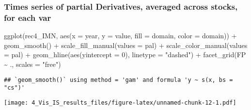\documentclass[
]{article}
\newenvironment{Shaded}{\begin{snugshade}}{\end{snugshade}}
\newcommand{\AttributeTok}[1]{\textcolor[rgb]{0.77,0.63,0.00}{#1}}
\newcommand{\DecValTok}[1]{\textcolor[rgb]{0.00,0.00,0.81}{#1}}
\newcommand{\FunctionTok}[1]{\textcolor[rgb]{0.00,0.00,0.00}{#1}}
\newcommand{\NormalTok}[1]{#1}
\newcommand{\SpecialCharTok}[1]{\textcolor[rgb]{0.00,0.00,0.00}{#1}}
\newcommand{\StringTok}[1]{\textcolor[rgb]{0.31,0.60,0.02}{#1}}
\begin{document}
\hypertarget{times-series-of-partial-derivatives-averaged-across-stocks-for-each-var-1}{%
\subsubsection{Times series of partial Derivatives, averaged across
stocks, for each
var}\label{times-series-of-partial-derivatives-averaged-across-stocks-for-each-var-1}}

\begin{Shaded}
\begin{Highlighting}[]
\FunctionTok{ggplot}\NormalTok{(rec4\_IMN, }\FunctionTok{aes}\NormalTok{(}\AttributeTok{x =}\NormalTok{ year, }\AttributeTok{y =}\NormalTok{ value, }\AttributeTok{fill =}\NormalTok{ domain, }\AttributeTok{color =}\NormalTok{ domain)) }\SpecialCharTok{+}
  \FunctionTok{geom\_smooth}\NormalTok{() }\SpecialCharTok{+}
  \FunctionTok{scale\_fill\_manual}\NormalTok{(}\AttributeTok{values =}\NormalTok{ pal) }\SpecialCharTok{+}
  \FunctionTok{scale\_color\_manual}\NormalTok{(}\AttributeTok{values =}\NormalTok{ pal) }\SpecialCharTok{+}
    \FunctionTok{geom\_hline}\NormalTok{(}\FunctionTok{aes}\NormalTok{(}\AttributeTok{yintercept =} \DecValTok{0}\NormalTok{),}
             \AttributeTok{linetype =} \StringTok{"dashed"}\NormalTok{) }\SpecialCharTok{+} 
  \FunctionTok{facet\_grid}\NormalTok{(FP }\SpecialCharTok{\textasciitilde{}}\NormalTok{ ., }\AttributeTok{scales =} \StringTok{"free"}\NormalTok{)}
\end{Highlighting}
\end{Shaded}

\begin{verbatim}
## `geom_smooth()` using method = 'gam' and formula 'y ~ s(x, bs = "cs")'
\end{verbatim}

\texttt{[image: 4\_Vis\_IS\_results\_files/figure-latex/unnamed-chunk-12-1.pdf]}
\end{document}
